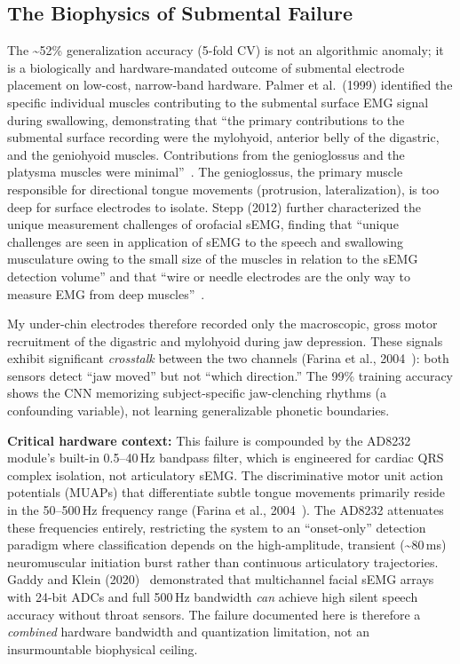\documentclass{article}
\begin{document}
\subsection{The Biophysics of Submental Failure}

The \textasciitilde52\% generalization accuracy (5-fold CV) is not an algorithmic anomaly; it is a biologically and hardware-mandated outcome of submental electrode placement on low-cost, narrow-band hardware. Palmer et al.\ (1999) identified the specific individual muscles contributing to the submental surface EMG signal during swallowing, demonstrating that ``the primary contributions to the submental surface recording were the mylohyoid, anterior belly of the digastric, and the geniohyoid muscles. Contributions from the genioglossus and the platysma muscles were minimal''~\cite{palmer1999}. The genioglossus, the primary muscle responsible for directional tongue movements (protrusion, lateralization), is too deep for surface electrodes to isolate. Stepp (2012) further characterized the unique measurement challenges of orofacial sEMG, finding that ``unique challenges are seen in application of sEMG to the speech and swallowing musculature owing to the small size of the muscles in relation to the sEMG detection volume'' and that ``wire or needle electrodes are the only way to measure EMG from deep muscles''~\cite{stepp2012}.

My under-chin electrodes therefore recorded only the macroscopic, gross motor recruitment of the digastric and mylohyoid during jaw depression. These signals exhibit significant \emph{crosstalk} between the two channels (Farina et al., 2004~\cite{farina2014}): both sensors detect ``jaw moved'' but not ``which direction.'' The 99\% training accuracy shows the CNN memorizing subject-specific jaw-clenching rhythms (a confounding variable), not learning generalizable phonetic boundaries.

\textbf{Critical hardware context:} This failure is compounded by the AD8232 module's built-in 0.5--40\,Hz bandpass filter, which is engineered for cardiac QRS complex isolation, not articulatory sEMG. The discriminative motor unit action potentials (MUAPs) that differentiate subtle tongue movements primarily reside in the 50--500\,Hz frequency range (Farina et al., 2004~\cite{farina2014}). The AD8232 attenuates these frequencies entirely, restricting the system to an ``onset-only'' detection paradigm where classification depends on the high-amplitude, transient (\textasciitilde80\,ms) neuromuscular initiation burst rather than continuous articulatory trajectories. Gaddy and Klein (2020)~\cite{gaddy2020} demonstrated that multichannel facial sEMG arrays with 24-bit ADCs and full 500\,Hz bandwidth \emph{can} achieve high silent speech accuracy without throat sensors. The failure documented here is therefore a \emph{combined} hardware bandwidth and quantization limitation, not an insurmountable biophysical ceiling.
\end{document}
